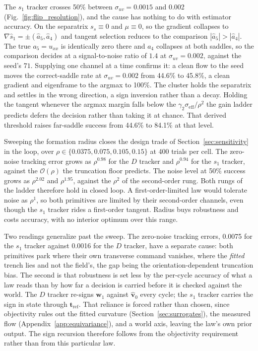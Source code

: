 \documentclass[lettersize,journal]{IEEEtran}
\begin{document}
The $s_1$ tracker crosses 50\% between $\sigma_{uv} = 0.0015$ and 0.002
(Fig.~\ref{fig:flip_resolution}), and the cause has nothing to do with
estimator accuracy. On the separatrix $s_s \equiv 0$ and $\mu \equiv 0$, so the gradient collapses to $\nabla\hat{s}_1 = \pm(\hat{a}_5, \hat{a}_4)$ and tangent selection reduces to the comparison $|\hat{a}_5| > |\hat{a}_4|$. The true $a_5 = u_{xx}$ is identically zero there and $a_4$ collapses at both saddles, so the comparison decides at a signal-to-noise ratio of $1.4$ at $\sigma_{uv} = 0.002$, against the seed's $71$. Supplying one channel at a time confirms it: a clean flow to the seed
moves the correct-saddle rate at $\sigma_{uv} = 0.002$ from 44.6\% to
45.8\%, a clean gradient and eigenframe to the argmax to 100\%. The cluster holds the separatrix and settles in the wrong
direction, a sign inversion rather than a decay. Holding the tangent whenever the argmax margin falls below the $\gamma_2\sigma_{\mathrm{eff}}/\rho^2$ the gain ladder predicts defers the decision rather than taking it at chance. That derived threshold raises far-saddle success from 44.6\% to 84.1\% at that level.

Sweeping the formation radius closes the design trade of
Section~\ref{sec:sensitivity} in the loop, over $\rho \in \{0.0375,
0.075, 0.105, 0.15\}$ at 400 trials per cell. The zero-noise tracking
error grows as $\rho^{0.98}$ for the $D$ tracker and $\rho^{0.94}$ for
the $s_1$ tracker, against the $\mathcal{O}(\rho)$ the truncation floor
predicts. The noise level at 50\% success grows as $\rho^{2.02}$ and
$\rho^{1.95}$, against the $\rho^2$ of the second-order rung. Both rungs of the ladder therefore hold in closed loop. A first-order-limited law would tolerate noise as $\rho^1$, so both primitives are limited by their second-order channels, even though the $s_1$ tracker rides a first-order tangent. Radius buys robustness and costs accuracy, with no interior optimum
over this range.

Two readings generalize past the sweep. The zero-noise tracking errors, 0.0075 for the $s_1$ tracker against 0.0016 for the $D$ tracker, have a separate cause: both primitives park where their own transverse command vanishes, where the \emph{fitted} trench lies and not the field's, the gap being the orientation-dependent truncation bias. The second is that robustness is set less by the per-cycle accuracy of what a law reads than by how far a decision is carried before it is checked against the world. The $D$ tracker re-signs $\mathbf{w}_1$ against $\hat{\mathbf{v}}_0$ every cycle; the $s_1$ tracker carries the sign in state through $\mathbf{t}_{\text{ref}}$. That reliance is forced rather than chosen,
since objectivity rules out the fitted curvature
(Section~\ref{sec:surrogates}), the measured flow
(Appendix~\ref{app:equivariance}), and a world axis, leaving the
law's own prior output. The sign recursion therefore follows from the
objectivity requirement rather than from this particular law.
\end{document}
